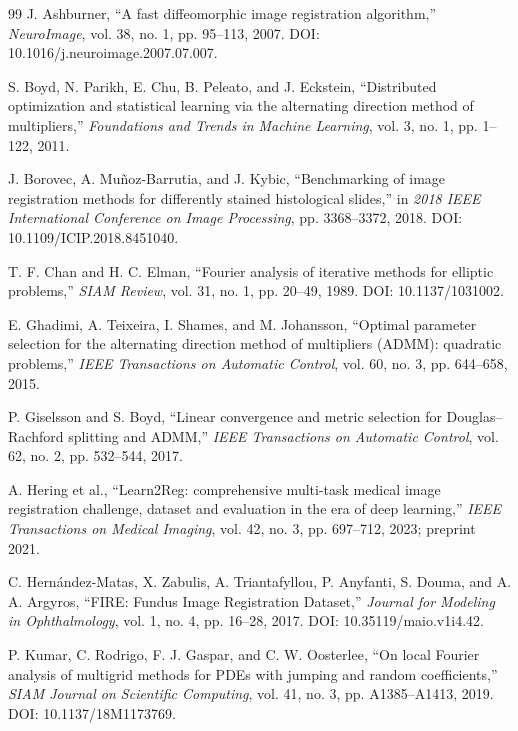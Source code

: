 \documentclass[pdflatex,iicol,sn-mathphys-num]{sn-jnl}
\theoremstyle{definition}\newtheorem{definition}[theorem]{Definition}\newtheorem{remark}[theorem]{Remark}
\begin{document}
\begin{thebibliography}{99}
J. Ashburner,
``A fast diffeomorphic image registration algorithm,''
\emph{NeuroImage}, vol. 38, no. 1, pp. 95--113, 2007.
DOI: 10.1016/j.neuroimage.2007.07.007.

S. Boyd, N. Parikh, E. Chu, B. Peleato, and J. Eckstein,
``Distributed optimization and statistical learning via the alternating direction method of multipliers,''
\emph{Foundations and Trends in Machine Learning}, vol. 3, no. 1, pp. 1--122, 2011.

J. Borovec, A. Mu\~noz-Barrutia, and J. Kybic,
``Benchmarking of image registration methods for differently stained histological slides,''
in \emph{2018 IEEE International Conference on Image Processing}, pp. 3368--3372, 2018.
DOI: 10.1109/ICIP.2018.8451040.

T. F. Chan and H. C. Elman,
``Fourier analysis of iterative methods for elliptic problems,''
\emph{SIAM Review}, vol. 31, no. 1, pp. 20--49, 1989.
DOI: 10.1137/1031002.

E. Ghadimi, A. Teixeira, I. Shames, and M. Johansson,
``Optimal parameter selection for the alternating direction method of multipliers (ADMM): quadratic problems,''
\emph{IEEE Transactions on Automatic Control}, vol. 60, no. 3, pp. 644--658, 2015.

P. Giselsson and S. Boyd,
``Linear convergence and metric selection for Douglas--Rachford splitting and ADMM,''
\emph{IEEE Transactions on Automatic Control}, vol. 62, no. 2, pp. 532--544, 2017.

A. Hering et al.,
``Learn2Reg: comprehensive multi-task medical image registration challenge, dataset and evaluation in the era of deep learning,''
\emph{IEEE Transactions on Medical Imaging}, vol. 42, no. 3, pp. 697--712, 2023; preprint 2021.

C. Hern\'andez-Matas, X. Zabulis, A. Triantafyllou, P. Anyfanti, S. Douma, and A. A. Argyros,
``FIRE: Fundus Image Registration Dataset,''
\emph{Journal for Modeling in Ophthalmology}, vol. 1, no. 4, pp. 16--28, 2017.
DOI: 10.35119/maio.v1i4.42.

P. Kumar, C. Rodrigo, F. J. Gaspar, and C. W. Oosterlee,
``On local Fourier analysis of multigrid methods for PDEs with jumping and random coefficients,''
\emph{SIAM Journal on Scientific Computing}, vol. 41, no. 3, pp. A1385--A1413, 2019.
DOI: 10.1137/18M1173769.


\end{thebibliography}
\end{document}
